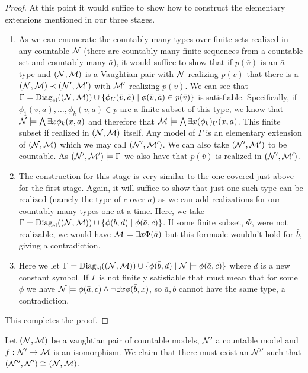 \begin{proof}
At this point it would suffice to show how to construct the elementary extensions mentioned in our three stages. 

\begin{enumerate}
\item As we can enumerate the countably many types over finite sets realized in any countable \(\mathcal{N}\) (there are countably many finite sequences from a countable set and countably many \(\bar{a}\)), it would suffice to show that if \(p(\bar{v})\) is an \(\bar{a}\)-type and \((\mathcal{N}, \mathcal{M})\) is a Vaughtian pair with \(\mathcal{N}\) realizing \(p(\bar{v})\) that there is a \((\mathcal{N}, \mathcal{M}) \prec (\mathcal{N}', \mathcal{M}')\) with \(\mathcal{M}'\) realizing \(p(\bar{v})\). 
We can see that \(\Gamma = \text{Diag}_\text{el}((\mathcal{N}, \mathcal{M})) \cup \{\phi_U(\bar{v}, \bar{a}) \mid \phi(\bar{v}, \bar{a}) \in  p(\bar{v})\}\) is satisfiable.  
Specifically, if \(\phi_1(\bar{v}, \bar{a}), \ldots, \phi_k(\bar{v}, \bar{a}) \in p\) are a finite subset of this type, we know that \(\mathcal{N} \models \bigwedge\limits \exists \bar{x} \phi_k(\bar{x},\bar{a})\) and therefore that \(\mathcal{M} \models \bigwedge\limits \exists \bar{x} (\phi_k)_U(\bar{x},\bar{a})\). 
This finite subset if realized in \((\mathcal{N}, \mathcal{M})\) itself. 
Any model of \(\Gamma\) is an elementary extension of \((\mathcal{N}, \mathcal{M})\) which we may call \((\mathcal{N}', \mathcal{M}')\).
We can also take \((\mathcal{N}', \mathcal{M}')\) to be countable. 
As \((\mathcal{N}', \mathcal{M}') \models \Gamma\) we also have that \(p(\bar{v})\) is realized in \((\mathcal{N}', \mathcal{M}')\). 

\item The construction for this stage is very similar to the one covered just above for the first stage.
Again, it will suffice to show that just one such type can be realized (namely the type of \(c\) over \(\bar{a}\)) as we can add realizations for our countably many types one at a time. 
Here, we take \(\Gamma = \text{Diag}_\text{el}((\mathcal{N}, \mathcal{M})) \cup \{\phi(\bar{b}, d) \mid \phi(\bar{a}, c)\}\). 
If some finite subset, \(\Phi\), were not realizable, we would have \(\mathcal{M} \models \exists x \Phi(\bar{a})\) but this formuale wouldn't hold for \(\bar{b}\), giving a contradiction. 

\item Here we let \(\Gamma = \text{Diag}_\text{el}((\mathcal{N}, \mathcal{M})) \cup \{\phi(\bar{b}, d) \mid \mathcal{N} \models \phi(\bar{a}, c)\}\) where \(d\) is a new constant symbol.
If \(\Gamma\) is not finitely satisfiable that must mean that for some \(\phi\) we have \(\mathcal{N} \models \phi(\bar{a}, c) \land \neg \exists x \phi(\bar{b}, x)\), 
so \(\bar{a}, \bar{b}\) cannot have the same type, a contradiction.
\end{enumerate}
This completes the proof. 
\end{proof}
\begin{lemma}\label{lemma_extend_isomorphically}
Let \((\mathcal{N}, \mathcal{M})\) be a vaughtian pair of countable models, \(\mathcal{N}'\) a countable model and \(f:\mathcal{N}' \to \mathcal{M}\) is an isomorphism. 
We claim that there must exist an \(\mathcal{N}''\) such that \((\mathcal{N}'', \mathcal{N}') \cong (\mathcal{N}, \mathcal{M})\). 
\end{lemma}

